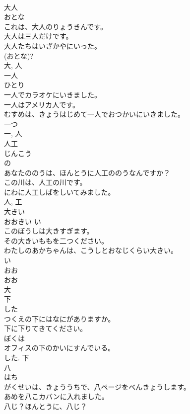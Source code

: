\documentclass[8pt]{extreport}
\begin{document}
\begin{CJK}{UTF8}{min}
\\	大人	
\\	おとな	
\\	これは、大人のりょうきんです。	
\\	大人は三人だけです。	
\\	大人たちはいざかやにいった。	
\\	(おとな)? 
\\	大, 人	
\\	一人	
\\	ひとり	
\\	一人でカラオケにいきました。	
\\	一人はアメリカ人です。	
\\	むすめは、きょうはじめて一人でおつかいにいきました。	
\\	一つ 
\\	一, 人	
\\	人工	
\\	じんこう	
\\	の 
\\	あなたののうは、ほんとうに人工ののうなんですか？	
\\	この川は、人工の川です。	
\\	にわに人工しばをしいてみました。	
\\	人, 工	
\\	大きい	
\\	おおきい	い 
\\	このぼうしは大きすぎます。	
\\	その大きいももを二つください。	
\\	わたしのあかちゃんは、こうしとおなじくらい大きい。	
\\	い 
\\	おお 
\\	おお 
\\	大	
\\	下	
\\	した	
\\	つくえの下にはなにがありますか。	
\\	下に下りてきてください。	
\\	ぼくは
\\	オフィスの下のかいにすんでいる。	
\\	した.	下	
\\	八	
\\	はち	
\\	がくせいは、きょううちで、八ページをべんきょうします。	
\\	あめを八こカバンに入れました。	
\\	八じ？ほんとうに、八じ？	

\end{CJK}
\end{document}
